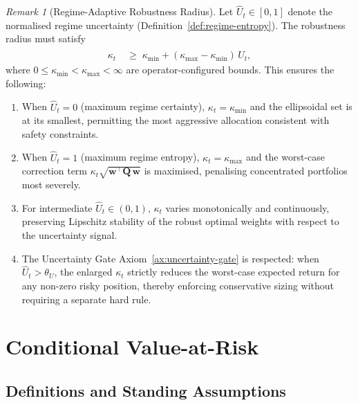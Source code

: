 \documentclass[12pt,openany]{book}
\newcommand{\bfw}{\mathbf{w}}
\newcommand{\bfQ}{\mathbf{Q}}
\numberwithin{equation}{chapter}
\theoremstyle{plain}
\theoremstyle{definition}
\theoremstyle{remark}
\newtheorem{remark}[theorem]{Remark}
\numberwithin{equation}{chapter}
\theoremstyle{plain}
\begin{document}
\begin{remark}[Regime-Adaptive Robustness Radius]
\label{rem:kappa-regime}
Let $\hat{U}_t \in [0,1]$ denote the normalised regime uncertainty
(Definition~\ref{def:regime-entropy}).  The robustness radius must
satisfy
\begin{align}
  \kappa_t &\;\geq\; \kappa_{\min} + (\kappa_{\max} - \kappa_{\min})\,\hat{U}_t,
  \label{eq:kappa-regime}
\end{align}
where $0 \leq \kappa_{\min} < \kappa_{\max} < \infty$ are
operator-configured bounds.  This ensures the following:
\begin{enumerate}
  \item When $\hat{U}_t = 0$ (maximum regime certainty), $\kappa_t =
        \kappa_{\min}$ and the ellipsoidal set is at its smallest,
        permitting the most aggressive allocation consistent with
        safety constraints.
  \item When $\hat{U}_t = 1$ (maximum regime entropy), $\kappa_t =
        \kappa_{\max}$ and the worst-case correction term
        $\kappa_t\sqrt{\bfw^\top \bfQ\,\bfw}$ is maximised,
        penalising concentrated portfolios most severely.
  \item For intermediate $\hat{U}_t \in (0,1)$, $\kappa_t$ varies
        monotonically and continuously, preserving Lipschitz stability
        of the robust optimal weights with respect to the uncertainty
        signal.
  \item The Uncertainty Gate Axiom~\ref{ax:uncertainty-gate} is
        respected: when $\hat{U}_t > \theta_U$, the enlarged $\kappa_t$
        strictly reduces the worst-case expected return for any non-zero
        risky position, thereby enforcing conservative sizing without
        requiring a separate hard rule.
\end{enumerate}
\end{remark}

\chapter{Conditional Value-at-Risk}
\label{ch:cvar}

\section{Definitions and Standing Assumptions}
\end{document}
